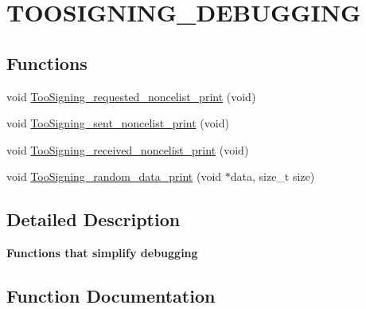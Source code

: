 \hypertarget{group__TOOSIGNING__DEBUGGING}{}\section{T\+O\+O\+S\+I\+G\+N\+I\+N\+G\+\_\+\+D\+E\+B\+U\+G\+G\+I\+NG}
\label{group__TOOSIGNING__DEBUGGING}
\subsection*{Functions}
\begin{DoxyCompactItemize}
\item 
void \hyperlink{group__TOOSIGNING__DEBUGGING_gabb54a5e4968d69e35d665869d5c6588f}{Too\+Signing\+\_\+requested\+\_\+noncelist\+\_\+print} (void)
\item 
void \hyperlink{group__TOOSIGNING__DEBUGGING_gab35891e0905f1ddec2ff8b649f63d5e5}{Too\+Signing\+\_\+sent\+\_\+noncelist\+\_\+print} (void)
\item 
void \hyperlink{group__TOOSIGNING__DEBUGGING_gaba98f230fad779da673a83370ad7de5d}{Too\+Signing\+\_\+received\+\_\+noncelist\+\_\+print} (void)
\item 
void \hyperlink{group__TOOSIGNING__DEBUGGING_ga73839f8ecb81bdbb2e6c36adab498dac}{Too\+Signing\+\_\+random\+\_\+data\+\_\+print} (void $\ast$data, size\+\_\+t size)
\end{DoxyCompactItemize}


\subsection{Detailed Description}
{\bfseries Functions that simplify debugging} 

\subsection{Function Documentation}
\mbox{\label{group__TOOSIGNING__DEBUGGING_ga73839f8ecb81bdbb2e6c36adab498dac}} 
